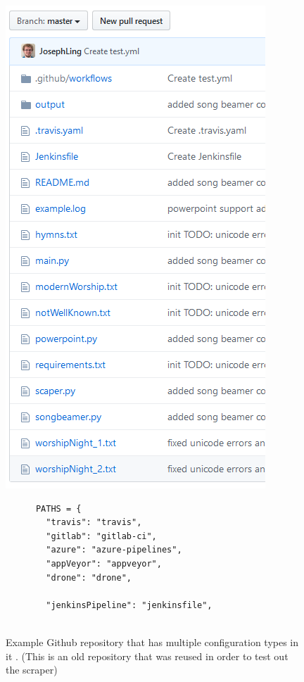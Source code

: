\documentclass[twoside,12pt,titlepage,a4paper]{article}
\begin{document}
\begin{figure}[!htbp]
  \centering
  \begin{minipage}{.48\textwidth}
    \centering
    \includegraphics[scale=0.5]{repository file system.png}
    
    \caption[alt text]{Example Github repository that has multiple configuration types in it \cite{GithubRepoExample}. (This is an old repository that was reused in order to test out the scraper)}
    \label{image_example_repo}
  \end{minipage}%
  \hfill
  \begin{minipage}{.48\textwidth}
    \begin{verbatim}
      PATHS = {
        "travis": "travis",
        "gitlab": "gitlab-ci",
        "azure": "azure-pipelines",
        "appVeyor": "appveyor",
        "drone": "drone",
    
        "jenkinsPipeline": "jenkinsfile",
        

\end{verbatim}
\end{minipage}
\end{figure}
\end{document}
